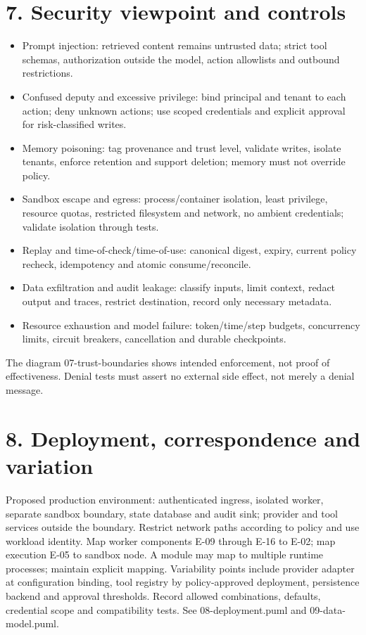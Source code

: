 \documentclass[11pt,letterpaper]{article}
\begin{document}
\section*{7. Security viewpoint and controls}
\begin{itemize}
\item Prompt injection: retrieved content remains untrusted data; strict tool schemas, authorization outside the model, action allowlists and outbound restrictions.
\item Confused deputy and excessive privilege: bind principal and tenant to each action; deny unknown actions; use scoped credentials and explicit approval for risk-classified writes.
\item Memory poisoning: tag provenance and trust level, validate writes, isolate tenants, enforce retention and support deletion; memory must not override policy.
\item Sandbox escape and egress: process/container isolation, least privilege, resource quotas, restricted filesystem and network, no ambient credentials; validate isolation through tests.
\item Replay and time-of-check/time-of-use: canonical digest, expiry, current policy recheck, idempotency and atomic consume/reconcile.
\item Data exfiltration and audit leakage: classify inputs, limit context, redact output and traces, restrict destination, record only necessary metadata.
\item Resource exhaustion and model failure: token/time/step budgets, concurrency limits, circuit breakers, cancellation and durable checkpoints.
\end{itemize}
The diagram 07-trust-boundaries shows intended enforcement, not proof of effectiveness. Denial tests must assert no external side effect, not merely a denial message.\par\smallskip
\section*{8. Deployment, correspondence and variation}
Proposed production environment: authenticated ingress, isolated worker, separate sandbox boundary, state database and audit sink; provider and tool services outside the boundary. Restrict network paths according to policy and use workload identity. Map worker components E-09 through E-16 to E-02; map execution E-05 to sandbox node. A module may map to multiple runtime processes; maintain explicit mapping. Variability points include provider adapter at configuration binding, tool registry by policy-approved deployment, persistence backend and approval thresholds. Record allowed combinations, defaults, credential scope and compatibility tests. See 08-deployment.puml and 09-data-model.puml.\par\smallskip
\end{document}
